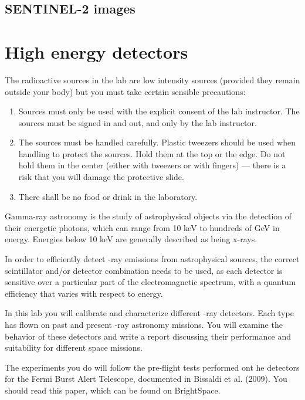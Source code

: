 \documentclass{tufte-book}
\begin{document}
\section{SENTINEL-2 images}

\chapter{High energy detectors}

\begin{tcolorbox}[colback=red!5,colframe=red!75!black,title=\textbf{Important
      --- Radiation Safety}] 
The radioactive sources in the lab are low intensity sources (provided they remain outside your body) but you must take certain sensible precautions: 
\begin{enumerate}
\item Sources must only be used with the explicit consent of the lab instructor. 
The sources must be signed in and out, and only by the lab instructor. 
\item The sources must be handled carefully. Plastic tweezers should be used
  when handling to protect the sources. Hold them at the top or the edge. Do
  not hold them in the center (either with tweezers or with fingers) --- there
  is a risk that you will damage the protective slide. 
\item There shall be no food or drink in the laboratory. 
\end{enumerate}
\end{tcolorbox} 

Gamma-ray astronomy is the study of astrophysical objects via the detection of their energetic photons, which can range from 10 keV to hundreds of GeV in energy. Energies below 10 keV are generally described as being x-rays.

In order to efficiently detect \textgamma-ray emissions from astrophysical sources, the correct scintillator and/or detector combination needs to be used, as each detector is sensitive over a particular part of the electromagnetic spectrum, with a quantum efficiency that varies with respect to energy.

In this lab you will calibrate and characterize different \textgamma-ray detectors. Each type has flown on past and present \textgamma-ray astronomy missions. You will examine the behavior of these detectors and write a report discussing their performance and suitability for different space missions.

The experiments you do will follow the pre-flight tests performed ont he detectors for the Fermi Burst Alert Telescope, documented in Bissaldi et al. (2009). You should read this paper, which can be found on BrightSpace. 
\end{document}
